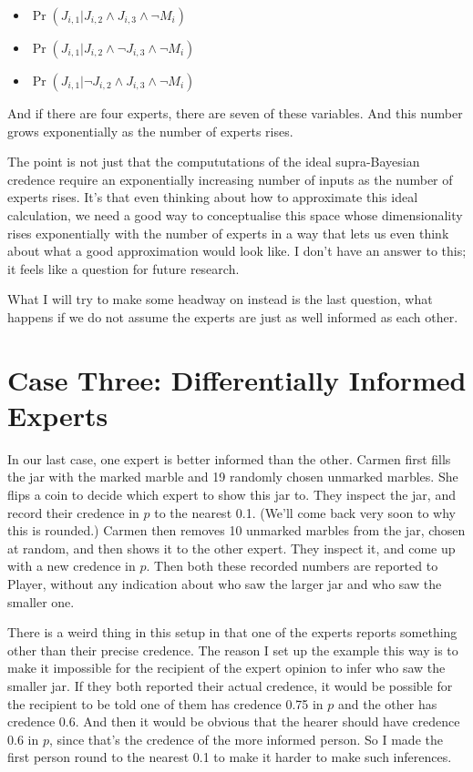 \documentclass[
  12pt,
]{article}
\providecommand{\tightlist}{%
  \setlength{\itemsep}{0pt}\setlength{\parskip}{0pt}}
\begin{document}
\begin{itemize}
\tightlist
\item
  \(\Pr(J_{i, 1} | J_{i, 2} \wedge J_{i, 3} \wedge \neg M_i)\)
\item
  \(\Pr(J_{i, 1} | J_{i, 2} \wedge \neg J_{i, 3} \wedge \neg M_i)\)
\item
  \(\Pr(J_{i, 1} | \neg J_{i, 2} \wedge J_{i, 3} \wedge \neg M_i)\)
\end{itemize}

And if there are four experts, there are seven of these variables. And
this number grows exponentially as the number of experts rises.

The point is not just that the compututations of the ideal
supra-Bayesian credence require an exponentially increasing number of
inputs as the number of experts rises. It's that even thinking about how
to approximate this ideal calculation, we need a good way to
conceptualise this space whose dimensionality rises exponentially with
the number of experts in a way that lets us even think about what a good
approximation would look like. I don't have an answer to this; it feels
like a question for future research.

What I will try to make some headway on instead is the last question,
what happens if we do not assume the experts are just as well informed
as each other.

\hypertarget{case-three-differentially-informed-experts}{%
\section{Case Three: Differentially Informed
Experts}\label{case-three-differentially-informed-experts}}

In our last case, one expert is better informed than the other. Carmen
first fills the jar with the marked marble and 19 randomly chosen
unmarked marbles. She flips a coin to decide which expert to show this
jar to. They inspect the jar, and record their credence in \(p\) to the
nearest 0.1. (We'll come back very soon to why this is rounded.) Carmen
then removes 10 unmarked marbles from the jar, chosen at random, and
then shows it to the other expert. They inspect it, and come up with a
new credence in \(p\). Then both these recorded numbers are reported to
Player, without any indication about who saw the larger jar and who saw
the smaller one.

There is a weird thing in this setup in that one of the experts reports
something other than their precise credence. The reason I set up the
example this way is to make it impossible for the recipient of the
expert opinion to infer who saw the smaller jar. If they both reported
their actual credence, it would be possible for the recipient to be told
one of them has credence 0.75 in \(p\) and the other has credence 0.6.
And then it would be obvious that the hearer should have credence 0.6 in
\(p\), since that's the credence of the more informed person. So I made
the first person round to the nearest 0.1 to make it harder to make such
inferences.
\end{document}
